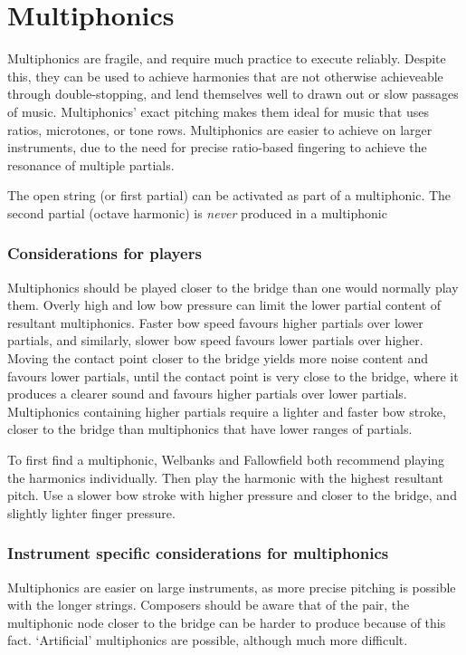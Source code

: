 \section{Multiphonics}\label{sec:multiphonics}

Multiphonics are fragile, and require much practice to execute reliably.
Despite this, they can be used to achieve harmonies that are not otherwise achieveable through double-stopping, and lend themselves well to drawn out or slow passages of music. 
Multiphonics' exact pitching makes them ideal for music that uses ratios, microtones, or tone rows. 
Multiphonics are easier to achieve on larger instruments, due to the need for precise ratio-based fingering to achieve the resonance of multiple partials.

The open string (or first partial) can be activated as part of a multiphonic.\autocite[161]{welbanksFoundationsModernCello}
The second partial (octave harmonic) is \emph{never} produced in a multiphonic


\subsubsection{Considerations for players}
Multiphonics should be played closer to the bridge than one would normally play them.
Overly high and low bow pressure can limit the lower partial content of resultant multiphonics.
Faster bow speed favours higher partials over lower partials, and similarly, slower bow speed favours lower partials over higher.
Moving the contact point closer to the bridge yields more noise content and favours lower partials, until the contact point is very close to the bridge, where it produces a clearer sound and favours higher partials over lower partials.\autocite[http://www.cellomap.com/index/the-string/multiphonics-and-other-multiple-sounds.html]{fallowfieldCelloMap}
Multiphonics containing higher partials require a lighter and faster bow stroke, closer to the bridge than multiphonics that have lower ranges of partials.\autocite[165]{welbanksFoundationsModernCello}

To first find a multiphonic, Welbanks and Fallowfield both recommend playing the harmonics individually.\autocite[167]{welbanksFoundationsModernCello}
Then play the harmonic with the highest resultant pitch. 
Use a slower bow stroke with higher pressure and closer to the bridge, and slightly lighter finger pressure.


\subsubsection{Instrument specific considerations for multiphonics}
Multiphonics are easier on large instruments, as more precise pitching is possible with the longer strings.
Composers should be aware that of the pair, the multiphonic node closer to the bridge can be harder to produce because of this fact.
`Artificial' multiphonics are possible, although much more difficult.\autocite[772]{guettlerBowedstringMultiphonicsAnalyzed2012}

